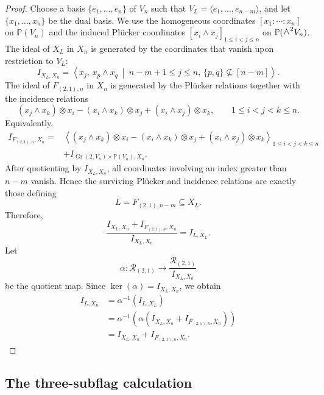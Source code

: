 \documentclass[a4paper,reqno]{amsart}
\theoremstyle{plainnopunct}
\theoremstyle{definitionnopunct}
\newcommand{\superwedge}{\mathlarger{\mathlarger{\wedge}}}
\renewcommand{\P}{\mathbb{P}}
\newcommand{\cR}{\mathcal{R}}
\DeclareMathOperator{\Gr}{Gr}
\begin{document}
\begin{proof}
Choose a basis
$
\{e_1,\ldots,e_n\}$ of $V_n$ such that
$
V_L
=
\langle e_1,\ldots,e_{n-m}\rangle$,
and let
$
\{x_1,\ldots,x_n\}$
be the dual basis. We use the homogeneous coordinates
$
[x_1:\cdots:x_n]
$
on $\P(V_n)$ and the induced Pl\"ucker coordinates
$
[x_i\wedge x_j]_{1\leq i<j\leq n}$
on $\P(\superwedge^2V_n)$. The ideal of $X_L$ in $X_n$ is generated by the coordinates that
vanish upon restriction to $V_L$:
\[
I_{X_L,X_n}
=
\left\langle
x_j,\,
x_p\wedge x_q
\ \middle|\
n-m+1\leq j\leq n,\,
\{p,q\}\not\subseteq[n-m]
\right\rangle.
\]
The ideal of $F_{(2,1),n}$ in $X_n$ is generated by the Pl\"ucker
relations together with the incidence relations
\[
(x_j\wedge x_k)\otimes x_i
-
(x_i\wedge x_k)\otimes x_j
+
(x_i\wedge x_j)\otimes x_k,
\qquad
1\leq i<j<k\leq n.
\]
Equivalently,
\[
\begin{aligned}
I_{F_{(2,1),n},X_n}
={}&
\left\langle
(x_j\wedge x_k)\otimes x_i
-
(x_i\wedge x_k)\otimes x_j
+
(x_i\wedge x_j)\otimes x_k
\right\rangle_{1\leq i<j<k\leq n}
\\
&+
I_{\Gr(2,V_n)\times\P(V_n),X_n}.
\end{aligned}
\]
After quotienting by $I_{X_L,X_n}$, all coordinates involving an
index greater than $n-m$ vanish. Hence the surviving Pl\"ucker and
incidence relations are exactly those defining
\[
L
=
F_{(2,1),n-m}
\subseteq
X_L.
\]
Therefore,
\[
\frac{
I_{X_L,X_n}
+
I_{F_{(2,1),n},X_n}
}{
I_{X_L,X_n}
}
=
I_{L,X_L}.
\]
Let
\[
\alpha:
\cR_{(2,1)}
\longrightarrow
\frac{\cR_{(2,1)}}{I_{X_L,X_n}}
\]
be the quotient map. Since $\ker(\alpha)=I_{X_L,X_n}$,
we obtain
\[
\begin{aligned}
I_{L,X_n}
&=
\alpha^{-1}(I_{L,X_L})
\\
&=
\alpha^{-1}
\left(
\alpha
\left(
I_{X_L,X_n}
+
I_{F_{(2,1),n},X_n}
\right)
\right)
\\
&=
I_{X_L,X_n}
+
I_{F_{(2,1),n},X_n}.
\end{aligned}
\]
\end{proof}

\subsection{The three-subflag calculation}
\label{subsect: three subflag calculation}
\end{document}
